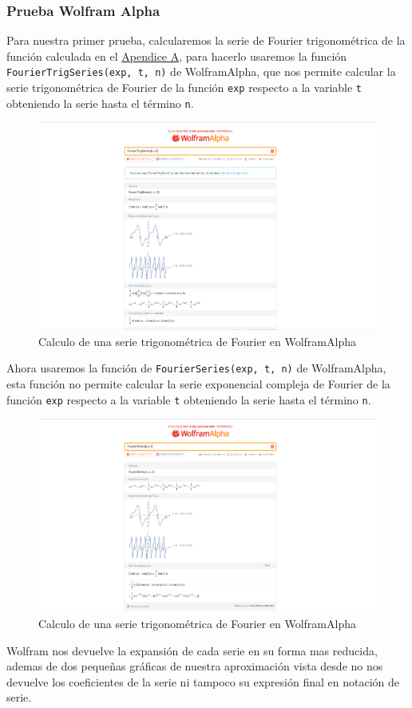 \subsubsection{Prueba Wolfram Alpha}
Para nuestra primer prueba, calcularemos la serie de Fourier trigonométrica de la función calculada en el  \hyperref[app1:trig-coeff]{Apendice A}, para hacerlo usaremos la función \texttt{FourierTrigSeries(exp, t, n)} de WolframAlpha, que nos permite calcular la serie trigonométrica de Fourier de la función \texttt{exp} respecto a la variable \texttt{t} obteniendo la serie hasta el término \texttt{n}.
\begin{figure}[H]
	\centering
	\includegraphics[width=1\textwidth]{img/chapter02/wolfram_trig_series.png}
	\caption{Calculo de una serie trigonométrica de Fourier en WolframAlpha}
	\label{fig:wolfram-trig-series}  %
\end{figure}
Ahora usaremos la función de \texttt{FourierSeries(exp, t, n)} de WolframAlpha, esta función no permite calcular la serie exponencial compleja de Fourier de la función \texttt{exp} respecto a la variable \texttt{t} obteniendo la serie hasta el término \texttt{n}.
\begin{figure}[H]
	\centering
	\includegraphics[width=1\textwidth]{img/chapter02/wolfram_complex_series.png}
	\caption{Calculo de una serie trigonométrica de Fourier en WolframAlpha}
	\label{fig:wolfram-exp-series}  %
\end{figure}
Wolfram nos devuelve la expansión de cada serie en su forma mas reducida, ademas de dos pequeñas gráficas de nuestra aproximación vista desde  no nos devuelve los coeficientes de la serie ni tampoco su expresión final en notación de serie.

